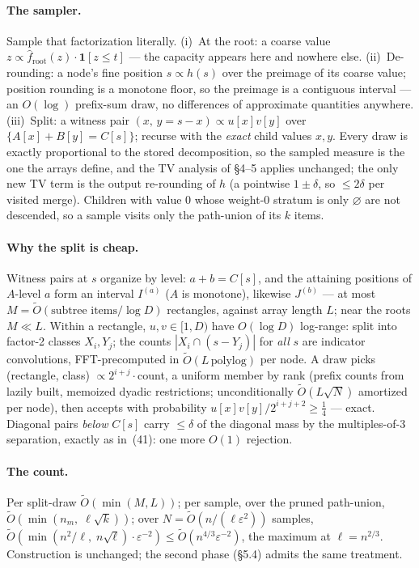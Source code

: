 \documentclass[10pt]{article}
\newcommand{\OO}{\widetilde{O}}
\begin{document}
\paragraph{The sampler.}
Sample that factorization literally. (i)~At the root: a coarse value
$z\propto \hat f_{\mathrm{root}}(z)\cdot\mathbf 1[z\le t]$ --- the
capacity appears here and nowhere else. (ii)~De-rounding: a node's fine
position $s\propto h(s)$ over the preimage of its coarse value; position
rounding is a monotone floor, so the preimage is a contiguous interval
--- an $O(\log)$ prefix-sum draw, no differences of approximate
quantities anywhere. (iii)~Split: a witness pair $(x,\,y=s-x)\propto
u[x]v[y]$ over $\{A[x]+B[y]=C[s]\}$; recurse with the \emph{exact} child
values $x,y$. Every draw is exactly proportional to the stored
decomposition, so the sampled measure is the one the arrays define, and
the TV analysis of \S4--5 applies unchanged; the only new TV term is the
output re-rounding of $h$ (a pointwise $1\pm\delta$, so $\le2\delta$ per
visited merge). Children with value $0$ whose weight-$0$ stratum is only
$\varnothing$ are not descended, so a sample visits only the path-union
of its $k$ items.

\paragraph{Why the split is cheap.}
Witness pairs at $s$ organize by level: $a+b=C[s]$, and the attaining
positions of $A$-level $a$ form an interval $I^{(a)}$ ($A$ is monotone),
likewise $J^{(b)}$ --- at most $M=\OO(\text{subtree items}/\log D)$
rectangles, against array length $L$; near the roots $M\ll L$. Within a
rectangle, $u,v\in[1,D)$ have $O(\log D)$ log-range: split into factor-2
classes $X_i,Y_j$; the counts $|X_i\cap(s-Y_j)|$ for \emph{all} $s$ are
indicator convolutions, FFT-precomputed in $\OO(L\,\mathrm{polylog})$
per node. A draw picks (rectangle, class) $\propto 2^{i+j}\cdot$count,
a uniform member by rank (prefix counts from lazily built, memoized
dyadic restrictions; unconditionally $\OO(L\sqrt{N})$ amortized per
node), then accepts with probability $u[x]v[y]/2^{i+j+2}\ge\tfrac14$ ---
exact. Diagonal pairs \emph{below} $C[s]$ carry $\le\delta$ of the
diagonal mass by the multiples-of-3 separation, exactly as in~(41): one
more $O(1)$ rejection.

\paragraph{The count.}
Per split-draw $\OO(\min(M,L))$; per sample, over the pruned path-union,
$\OO(\min(n_m,\;\ell\sqrt{k}))$; over $N=\OO(n/(\ell\varepsilon^2))$
samples, $\OO(\min(n^2/\ell,\;n\sqrt{\ell})\cdot\varepsilon^{-2})
\le\OO(n^{4/3}\varepsilon^{-2})$, the maximum at $\ell=n^{2/3}$.
Construction is unchanged; the second phase (\S5.4) admits the same
treatment.
\end{document}

